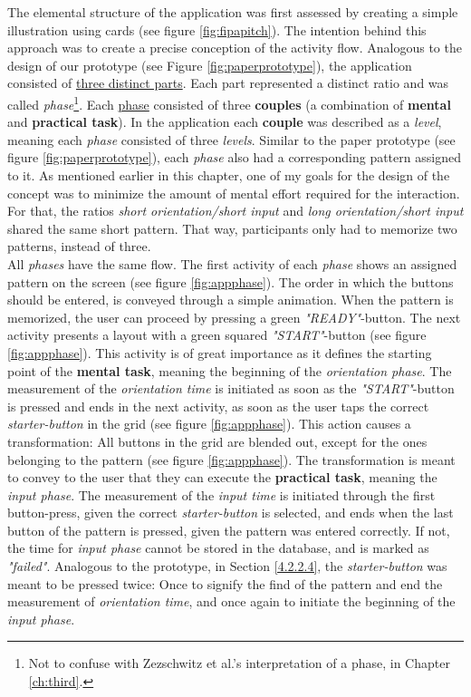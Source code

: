 The elemental structure of the application was first assessed by creating a simple illustration using cards (see figure \ref{fig:fipapitch}). The intention behind this approach was to create a precise conception of the activity flow. Analogous to the design of our prototype (see Figure \ref{fig:paperprototype}), the application consisted of \underline{three distinct parts}. Each part represented a distinct ratio and was called  \textit{phase}\footnote{Not to confuse with Zezschwitz et al.'s interpretation of a phase, in Chapter \ref{ch:third}.}. 
Each \underline{phase} consisted of three \textbf{couples} (a combination of \textbf{mental} and \textbf{practical task}). In the application each \textbf{couple} was described as a \textit{level}, meaning each \textit{phase} consisted of three \textit{levels}. Similar to the paper prototype (see figure \ref{fig:paperprototype}), each \textit{phase} also had a corresponding pattern assigned to it. As mentioned earlier in this chapter, one of my goals for the design of the concept was to minimize the amount of mental effort required for the interaction. For that, the ratios \textit{short orientation/short input} and \textit{long orientation/short input} shared the same short pattern. That way, participants only had to memorize two patterns, instead of three.\\

All \textit{phases} have the same flow. The first activity of each \textit{phase} shows an assigned pattern on the screen (see figure \ref{fig:appphase}). The order in which the buttons should be entered, is conveyed through a simple animation. When the pattern is memorized, the user can proceed by pressing a green \textit{"READY"}-button. The next activity presents a layout with a green squared \textit{"START"}-button (see figure \ref{fig:appphase}). This activity is of great importance as it defines the starting point of the \textbf{mental task}, meaning the beginning of the \textit{orientation phase}. The measurement of the \textit{orientation time} is initiated as soon as the \textit{"START"}-button is pressed and ends in the next activity, as soon as the user taps the correct \textit{starter-button} in the grid (see figure \ref{fig:appphase}). This action causes a transformation: All buttons in the grid are blended out, except for the ones belonging to the pattern (see figure \ref{fig:appphase}). The transformation is meant to convey to the user that they can execute the \textbf{practical task}, meaning the \textit{input phase}. The measurement of the \textit{input time} is initiated through the first button-press, given the correct \textit{starter-button} is selected, and ends when the last button of the pattern is pressed, given the pattern was entered correctly. If not, the time for \textit{input phase} cannot be stored in the database, and is marked as \textit{"failed"}. Analogous to the prototype, in Section \ref{4.2.2.4}, the \textit{starter-button} was meant to be pressed twice: Once to signify the find of the pattern and end the measurement of \textit{orientation time}, and once again to initiate the beginning of the \textit{input phase}. 

